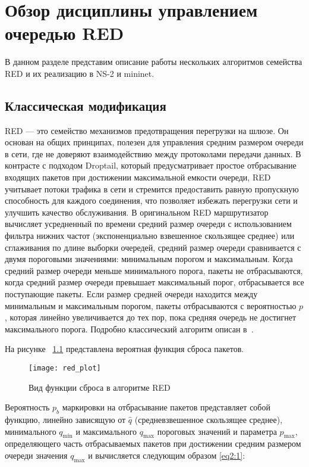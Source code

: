 \chapter{Обзор дисциплины управлением очередью RED}
\label{chap2}

В данном разделе представим описание работы нескольких алгоритмов семейства RED и их реализацию в NS-2 и mininet. 

\section{Классическая модификация}
\label{chap2:sec1}

RED — это семейство механизмов предотвращения перегрузки
на шлюзе. Он основан на общих принципах, полезен для управления
средним размером очереди в сети, где не доверяют взаимодействию между
протоколами передачи данных. В контрасте с подходом Droptail, который предусматривает 
простое отбрасывание входящих пакетов при достижении максимальной емкости очереди, RED учитывает
потоки трафика в сети и стремится предоставить равную пропускную
способность для каждого соединения, что позволяет избежать перегрузки
сети и улучшить качество обслуживания. В оригинальном RED
маршрутизатор вычисляет усредненный по времени средний размер очереди
с использованием фильтра нижних частот (экспоненциально взвешенное
скользящее среднее) или сглаживания по длине выборки очередей, средний
размер очереди сравнивается с двумя пороговыми значениями: минимальным
порогом и максимальным. Когда средний размер очереди меньше
минимального порога, пакеты не отбрасываются, когда средний размер
очереди превышает максимальный порог, отбрасывается все поступающие
пакеты. Если размер средней очереди находится между минимальным и
максимальным порогом, пакеты отбрасываются с вероятностью $p$, которая
линейно увеличивается до тех пор, пока средняя очередь не достигнет
максимального порога. Подробно классический алгоритм описан в~\cite{RED1, RED0}.


На рисунке ~\ref{fig1} представлена вероятная функция сброса пакетов.
 
\begin{figure}[h!]
 \centerline{\texttt{[image: red\_plot]}}
 \caption{Вид функции сброса в алгоритме RED}
\label{fig1}
\end{figure}


Вероятность $p_{b}$ маркировки на отбрасывание пакетов представляет
собой функцию, линейно зависящую от $\hat{q}$ (средневзвешенное 
скользящее среднее), минимального $q_{\min}$ и максимального
$q_{\max}$ пороговых значений и параметра $p_{\max}$, определяющего
часть отбрасываемых пакетов при достижении средним размером очереди
значения $q_{\max}$ и вычисляется следующим образом \eqref{eq2:1}:

